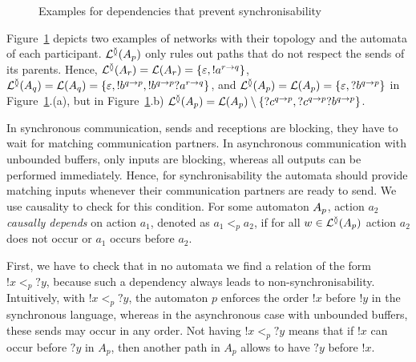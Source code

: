 \documentclass[submission,copyright,creativecommons,UKenglish]{eptcs}
\begin{document}
\begin{figure}[t]
	\caption{Examples for dependencies that prevent synchronisability}
	\label{fig:notSynchronisable}
\end{figure}

\begin{example}
	Figure~\ref{fig:notSynchronisable} depicts two examples of networks with their topology and the automata of each participant. 
	$ \mathcal{L}^{\between}{\left( A_{p} \right)} $ only rules out paths that do not respect the sends of its parents.
	Hence, $ \mathcal{L}^{\between}{\left( A_{r} \right)} = \mathcal{L}{\left(A_{r}\right)} = {\left\lbrace \varepsilon, !a^{r \rightarrow q} \right\rbrace} $, $ \mathcal{L}^{\between}{\left( A_{q} \right)} = \mathcal{L}{\left(A_{q}\right)} = {\left\lbrace \varepsilon, !b^{q \rightarrow p}, !b^{q \rightarrow p} ?a^{r \rightarrow q} \right\rbrace} $, and $ \mathcal{L}^{\between}{\left( A_{p} \right)} = \mathcal{L}{\left(A_{p}\right)} = {\left\lbrace \varepsilon, ?b^{q \rightarrow p} \right\rbrace} $ in Figure~\ref{fig:notSynchronisable}.(a), but in Figure~\ref{fig:notSynchronisable}.b) $ \mathcal{L}^{\between}{\left( A_{p} \right)} = \mathcal{L}{\left(A_{p}\right)} \setminus {\left\lbrace  ?c^{q \rightarrow p}, ?c^{q \rightarrow p} ?b^{q \rightarrow p}  \right\rbrace} $.
\end{example}

In synchronous communication, sends and receptions are blocking, \ie they have to wait for matching communication partners.
In asynchronous communication with unbounded buffers, only inputs are blocking, whereas all outputs can be performed immediately.
Hence, for synchronisability the automata should provide matching inputs whenever their communication partners are ready to send.
We use causality to check for this condition.
For some automaton $ A_{p} $, action $ a_2 $ \emph{causally depends} on action $ a_1 $, denoted as $ a_1 <_{p} a_2 $, if for all $ w \in \mathcal{L}^{\between}{\left( A_{p} \right)} $ action $ a_2 $ does not occur or $ a_1 $ occurs before $ a_2 $.

First, we have to check  that in no automata we find a relation of the form $ !x <_p ?y $, because such a dependency always leads to non-synchronisability.
Intuitively, with $ !x <_p ?y $, the automaton $ p $ enforces the order $ !x $ before $ !y $ in the synchronous language, whereas in the asynchronous case with unbounded buffers, these sends may occur in any order.
Not having $ !x <_p ?y $ means that if $ !x $ can occur before $ ?y $ in $ A_p $, then another path in $ A_p $ allows to have $ ?y $ before $ !x $. 
\end{document}
